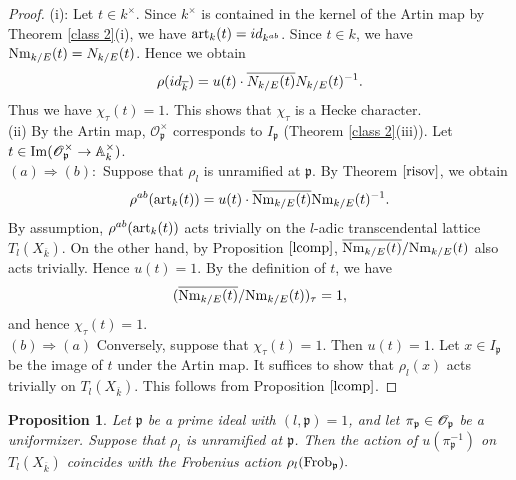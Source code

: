 \documentclass[reqno,a4paper,11pt]{amsart}
\newtheorem{prop}[dfn]{Proposition}
\theoremstyle{definition}
\theoremstyle{definition}
\begin{document}
    \begin{proof}
(i): Let $t\in k^{\times}$. Since $k^{\times}$ is contained in the kernel of the Artin map by Theorem \ref{class 2}(i), we have ${\rm art}_{k}(t)=id_{k^{ab}}$. Since $t\in k$, we have  ${\rm Nm}_{k/E}(t)=N_{k/E}(t)$. Hence we obtain 
        \begin{align}
            \rho(id_{\overline{k}})=u(t)\cdot \overline{N_{k/E}(t)}N_{k/E}(t)^{-1}.\notag
        \end{align}
         Thus we have $\chi_{\tau}(t)=1$. This shows that $\chi_{\tau}$ is a Hecke character.
\\ (ii) By the Artin map, $\mathscr{O}^{\times}_{\mathfrak{p}}$ corresponds to $I_{\mathfrak{p}}$ (Theorem \ref{class 2}(iii)). Let $t\in {\rm Im}( \mathscr{O}^{\times}_{\mathfrak{p}}\to \mathbb{A}^{\times}_{k})$.
      \\ $(a)\Rightarrow (b) : $ Suppose that $\rho_{l}$ is unramified at $\mathfrak{p}$. By Theorem $\ref{risov}$, we obtain  
      \begin{align}
          \rho^{ab}({\rm art}_{k}(t))=u(t)\cdot \overline{{\rm Nm}_{k/E}(t)}{\rm Nm}_{k/E}(t)^{-1}.\notag
      \end{align}
      By assumption, $\rho^{ab}({\rm art}_{k}(t))$ acts trivially on the $l$-adic transcendental lattice $T_{l}(X_{\overline{k}}).$ On the other hand, by Proposition $\ref{lcomp}$, $\overline{{\rm Nm}_{k/E}(t)}/{\rm Nm}_{k/E}(t)$ also acts trivially. Hence $u(t)=1.$ By the definition of $t$, we have 
      \begin{align}\notag(\overline{{\rm Nm}_{k/E}(t)}/{\rm Nm}_{k/E}(t))_{\tau}=1,
      \end{align}
      and hence $\chi_{\tau}(t)=1.$
      \\ $(b)\Rightarrow (a)$ 
      Conversely, suppose that $\chi_{\tau}(t)=1.$ Then  $u(t)=1$. Let $x\in I_{\mathfrak{p}}$ be the image of $t$ under the Artin map. It suffices to show that $\rho_{l}(x)$ acts trivially on $T_{l}(X_{\overline{k}})$. This follows  from Proposition $\ref{lcomp}$.
    \end{proof}
    \begin{prop}\label{eigen}Let $\mathfrak{p}$ be a prime ideal with $(l, \mathfrak{p})=1$, and let $\pi_{\mathfrak{p}}\in \mathscr{O}_{\frak{p}}$ be a uniformizer. Suppose that $\rho_{l}$ is unramified at $\mathfrak{p}$. Then the action of $u(\pi_{\mathfrak{p}}^{-1})$ on $T_{l}(X_{\overline{k}})$ coincides with the Frobenius action $\rho_{l}({\rm Frob}_{\mathfrak{p}}).$ 
  \end{prop}
\end{document}
